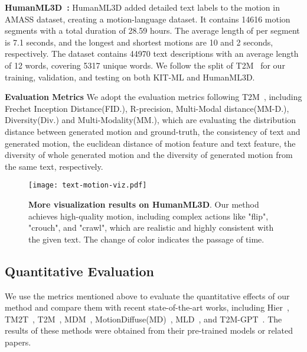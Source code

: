 \documentclass[10pt,twocolumn,letterpaper]{article}
\begin{document}
\textbf{HumanML3D~\cite{guo2022generating}:} HumanML3D added detailed text labels to the motion in AMASS dataset, creating a motion-language dataset. It contains 14616 motion segments with a total duration of 28.59 hours. The average length of per segment is 7.1 seconds, and the longest and shortest motions are 10 and 2 seconds, respectively. The dataset contains 44970 text descriptions with an average length of 12 words, covering 5317 unique words. We follow the split of T2M~\cite{guo2022generating} for our training, validation, and testing on both KIT-ML and HumanML3D.



\textbf{Evaluation Metrics}\quad
We adopt the evaluation metrics following T2M~\cite{guo2022generating}, including Frechet Inception Distance(FID.), R-precision, Multi-Modal distance(MM-D.), Diversity(Div.) and Multi-Modality(MM.), which are evaluating the distribution distance between generated motion and ground-truth, the consistency of text and generated motion, the euclidean distance of motion feature and text feature, the diversity of whole generated motion and the diversity of generated motion from the same text, respectively.




\begin{figure*}[t]
    \centering
    \texttt{[image: text-motion-viz.pdf]}
    \caption{\textbf{More visualization results on HumanML3D}. Our method achieves high-quality motion, including complex actions like "flip", "crouch", and "crawl", which are realistic and highly consistent with the given text. The change of color indicates the passage of time.}
    \label{img:04}
\end{figure*}



\subsection{Quantitative Evaluation}\label{ssec:sota_quanti}

We use the metrics mentioned above to evaluate the quantitative effects of our method and compare them with recent state-of-the-art works, including Hier~\cite{ghosh2021synthesis}, TM2T~\cite{guo2022tm2t}, T2M~\cite{guo2022generating}, MDM~\cite{tevet2023human}, MotionDiffuse(MD)~\cite{zhang2022motiondiffuse}, MLD~\cite{chen2023mld}, and T2M-GPT~\cite{zhang2023t2m}. The results of these methods were obtained from their pre-trained models or related papers.
\end{document}
